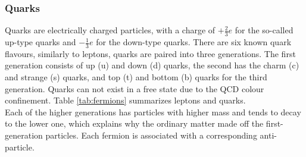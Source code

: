 \subsubsection{Quarks}
Quarks are electrically charged particles, with a charge of $+\frac{2}{3}e$ for the so-called up-type quarks and $-\frac{1}{3}e$ for the down-type quarks. There are six known quark flavours, similarly to leptons, quarks are paired into three generations. The first generation consists of up (u) and down (d) quarks, the second has the charm (c) and strange (s) quarks, and top (t) and bottom (b) quarks for the third generation. Quarks can not exist in a free state due to the QCD colour confinement. Table \ref{tab:fermions} summarizes leptons and quarks. \\
Each of the higher generations has particles with higher mass and tends to decay to the lower one, which explains why the ordinary matter made off the first-generation particles. Each fermion is associated with a corresponding anti-particle.
